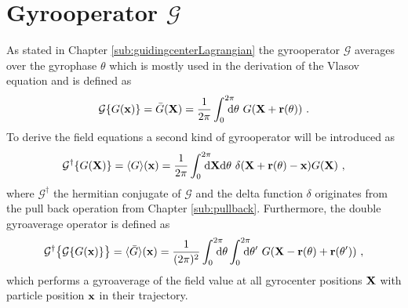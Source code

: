 \section{Gyrooperator $\mathcal{G}$}
\label{sec:gyroOperator}

As stated in Chapter \ref{sub:guidingcenterLagrangian} the gyrooperator $\mathcal{G}$ averages over the gyrophase $\theta$ which is mostly used in the derivation of the Vlasov equation and is defined as
\begin{gather}
    \mathcal{G} \{G(\boldsymbol{\mathbf{x}})\} = \bar{G}(\boldsymbol{\mathbf{X}}) = \frac{1}{2\pi} \int_{0}^{2\pi} \!\!\!\!\! \mathrm{d}\theta ~ G(\boldsymbol{\mathbf{X}} + \boldsymbol{\mathbf{r}}(\theta))~.
    \label{eq:gyroOperatorRevision}
\end{gather}
To derive the field equations a second kind of gyrooperator will be introduced as
\begin{gather}
    \mathcal{G}^\dagger \{G(\boldsymbol{\mathbf{X}})\} = \langle G\rangle(\boldsymbol{\mathbf{x}}) = \frac{1}{2\pi} \int_{0}^{2\pi} \!\!\!\!\! \mathrm{d}\boldsymbol{\mathbf{X}}\mathrm{d}\theta ~ \delta(\boldsymbol{\mathbf{X}} + \boldsymbol{\mathbf{r}}(\theta) - \boldsymbol{\mathbf{x}}) G(\boldsymbol{\mathbf{X}})~,
    \label{eq:gyroOperatorDagger}
\end{gather}
where $\mathcal{G}^\dagger$ the hermitian conjugate of $\mathcal{G}$\cite{Told_PHD} and the delta function $\delta$ originates from the pull back operation from Chapter \ref{sub:pullback}.\cite{Merlo_PHD} Furthermore, the double gyroaverage operator is defined as
\begin{gather}
    \tgad{\bigl\{ \tga{\{G(\x)\}} \bigr\}} = \gad{\ga{G}}(\x) = \frac{1}{(2\pi)^2} \intss{0}{2\pi} \dtheta \intss{0}{2\pi} \dtheta' ~ G(\X - \rrho(\theta) + \rrho(\theta'))~,
    \label{eq:gyroOperatorDouble}
\end{gather}
which performs a gyroaverage of the field value at all gyrocenter positions $\boldsymbol{\mathbf{X}}$ with particle position $\boldsymbol{\mathbf{x}}$ in their trajectory. \cite{Maurer_PHD}

